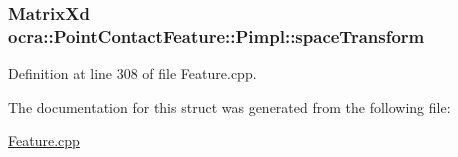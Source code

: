 \subsubsection[{\texorpdfstring{space\+Transform}{spaceTransform}}]{\setlength{\rightskip}{0pt plus 5cm}Matrix\+Xd ocra\+::\+Point\+Contact\+Feature\+::\+Pimpl\+::space\+Transform}\hypertarget{structocra_1_1PointContactFeature_1_1Pimpl_a2636a91b8abaabb52ac34a4121e9e115}{}\label{structocra_1_1PointContactFeature_1_1Pimpl_a2636a91b8abaabb52ac34a4121e9e115}


Definition at line 308 of file Feature.\+cpp.



The documentation for this struct was generated from the following file\+:\begin{DoxyCompactItemize}
\item 
\hyperlink{Feature_8cpp}{Feature.\+cpp}\end{DoxyCompactItemize}
